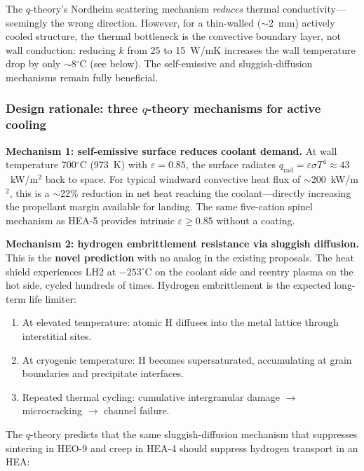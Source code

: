 \documentclass[12pt,letterpaper]{article}
\theoremstyle{definition}
\begin{document}
The $q$-theory's Nordheim scattering mechanism \emph{reduces} thermal conductivity---seemingly the wrong direction.  However, for a thin-walled ($\sim$2~mm) actively cooled structure, the thermal bottleneck is the convective boundary layer, not wall conduction: reducing $k$ from 25 to 15~W/mK increases the wall temperature drop by only $\sim$8$^\circ$C (see below).  The self-emissive and sluggish-diffusion mechanisms remain fully beneficial.

\subsubsection{Design rationale: three $q$-theory mechanisms for active cooling}

\textbf{Mechanism 1: self-emissive surface reduces coolant demand.}  At wall temperature 700$^\circ$C (973~K) with $\varepsilon = 0.85$, the surface radiates $q_{\mathrm{rad}} = \varepsilon\sigma T^4 \approx 43$~kW/m$^2$ back to space.  For typical windward convective heat flux of $\sim$200~kW/m$^2$, this is a $\sim$22\% reduction in net heat reaching the coolant---directly increasing the propellant margin available for landing.  The same five-cation spinel mechanism as HEA-5 provides intrinsic $\varepsilon \geq 0.85$ without a coating.

\textbf{Mechanism 2: hydrogen embrittlement resistance via sluggish diffusion.}  This is the \textbf{novel prediction} with no analog in the existing proposals.  The heat shield experiences LH2 at $-253^\circ$C on the coolant side and reentry plasma on the hot side, cycled hundreds of times.  Hydrogen embrittlement is the expected long-term life limiter:

\begin{enumerate}
  \item At elevated temperature: atomic H diffuses into the metal lattice through interstitial sites.
  \item At cryogenic temperature: H becomes supersaturated, accumulating at grain boundaries and precipitate interfaces.
  \item Repeated thermal cycling: cumulative intergranular damage $\to$ microcracking $\to$ channel failure.
\end{enumerate}

The $q$-theory predicts that the same sluggish-diffusion mechanism that suppresses sintering in HEO-9 and creep in HEA-4 should suppress hydrogen transport in an HEA:
\end{document}
